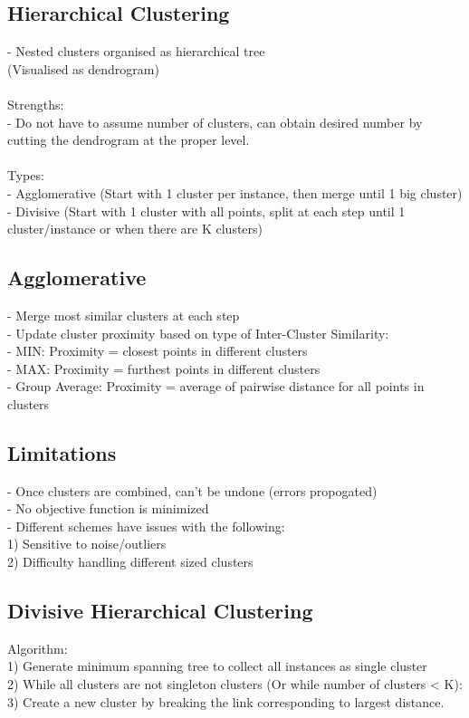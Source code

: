 \subsection*{Hierarchical Clustering}
- Nested clusters organised as hierarchical tree\\
(Visualised as dendrogram)\\\\
Strengths:\\
- Do not have to assume number of clusters, can obtain desired 
number by cutting the dendrogram at the proper level.\\\\
Types:\\
- Agglomerative (Start with 1 cluster per instance, then merge until 1 big cluster)\\
- Divisive (Start with 1 cluster with all points, split at each step until 1 cluster/instance or when 
there are K clusters)

\subsection*{Agglomerative}
- Merge most similar clusters at each step\\
- Update cluster proximity based on type of Inter-Cluster Similarity:\\
- MIN: Proximity = closest points in different clusters\\
- MAX: Proximity = furthest points in different clusters\\
- Group Average: Proximity = average of pairwise distance for all points in clusters\\

\subsection*{Limitations}
- Once clusters are combined, can't be undone (errors propogated)\\
- No objective function is minimized\\
- Different schemes have issues with the following:\\
1) Sensitive to noise/outliers\\
2) Difficulty handling different sized clusters\\

\subsection*{Divisive Hierarchical Clustering}
Algorithm:\\
1) Generate minimum spanning tree to collect all instances as single cluster\\
2) While all clusters are not singleton clusters (Or while number of clusters < K):\\
3) Create a new cluster by breaking the link corresponding to largest distance.

